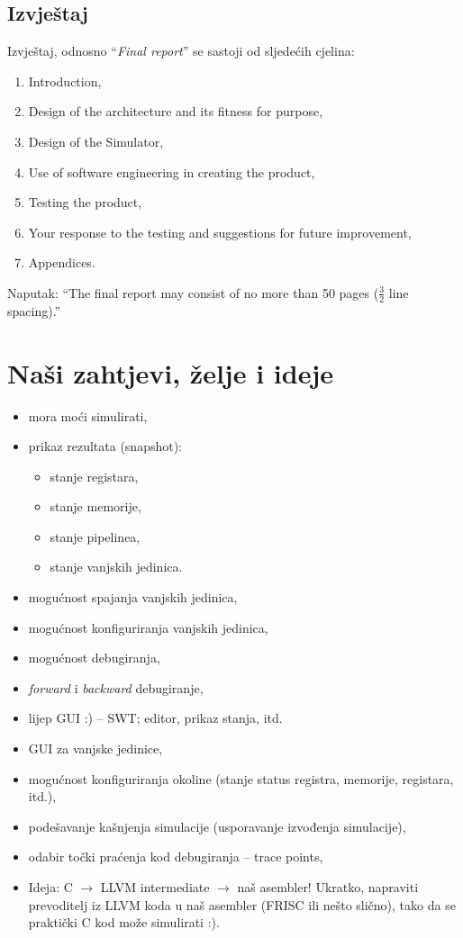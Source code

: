 \documentclass{article}
\begin{document}
\subsection{Izvještaj}
Izvještaj, odnosno ``\emph{Final report}'' se sastoji od sljedećih cjelina:
\begin{enumerate}
 \item Introduction,
 \item Design of the architecture and its fitness for purpose,
 \item Design of the Simulator,
 \item Use of software engineering in creating the product,
 \item Testing the product,
 \item Your response to the testing and suggestions for future improvement,
 \item Appendices.
\end{enumerate}
{\sc Naputak:} ``The final report may consist of no more than 50 pages ($\frac{3}{2}$ line spacing).''

\section{Naši zahtjevi, želje i ideje}
\begin{itemize}
  \item mora moći simulirati,
  \item prikaz rezultata (snapshot):
  \begin{itemize}
    \item stanje registara,
    \item stanje memorije,
    \item stanje pipelinea,
    \item stanje vanjskih jedinica.
  \end{itemize}
  \item mogućnost spajanja vanjskih jedinica,
  \item mogućnost konfiguriranja vanjskih jedinica,
  \item mogućnost debugiranja,
  \item \emph{forward} i \emph{backward} debugiranje,
  \item lijep GUI :) -- SWT; editor, prikaz stanja, itd.
  \item GUI za vanjske jedinice,
  \item mogućnost konfiguriranja okoline (stanje status registra, memorije, registara, itd.),
  \item podešavanje kašnjenja simulacije (usporavanje izvođenja simulacije),
  \item odabir točki praćenja kod debugiranja -- trace points,
  \item {\sc Ideja:} C $\rightarrow$ LLVM intermediate $\rightarrow$ naš asembler!
  Ukratko, napraviti prevoditelj iz LLVM koda u naš asembler (FRISC ili nešto slično),
  tako da se praktički C kod može simulirati :).
\end{itemize}
\end{document}
